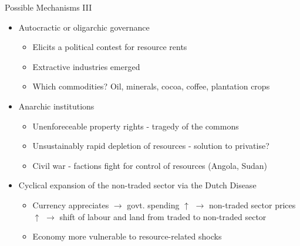 \documentclass[11pt,notes=hide,aspectratio=169,mathserif]{beamer}
\begin{document}
\begin{frame}{Possible Mechanisms III}
\begin{itemize}
\item Autocractic or oligarchic governance
\begin{itemize}
    \pause \item Elicits a political contest for resource rents
    \pause \item Extractive industries emerged 
    \pause \item Which commodities? Oil, minerals, cocoa, coffee, plantation crops
\end{itemize}
\item Anarchic institutions
\begin{itemize}
    \pause \item Unenforeceable property rights - tragedy of the commons
    \pause \item Unsustainably rapid depletion of resources - solution to privatise?
    \pause \item Civil war - factions fight for control of resources (Angola, Sudan) 
\end{itemize}
\pause \item Cyclical expansion of the non-traded sector via the Dutch Disease
\begin{itemize}
    \pause \item Currency appreciates $\rightarrow$ govt. spending $\uparrow$ $\rightarrow$ non-traded sector prices $\uparrow$ $\rightarrow$ shift of labour and land from traded to non-traded sector
    \pause \item Economy more vulnerable to resource-related shocks
\end{itemize}
\end{itemize}
\end{frame}
\end{document}
